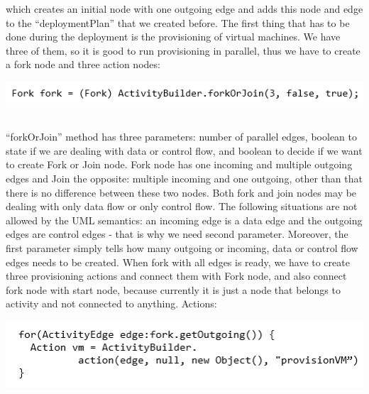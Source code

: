 \noindent which creates an initial node with one outgoing edge and adds this node and edge to the ``deploymentPlan'' that we created before. The first thing that has to be done during the deployment is the provisioning of virtual machines. We have three of them, so it is good to run provisioning in parallel, thus we have to create a fork node and three action nodes:

\begin{center}
	\includegraphics{./Figures/Fork}
	\begin{lstlisting}[mathescape,caption={Fork or Join node},label={lst:5}]
	\end{lstlisting}
\end{center} 

\noindent ``forkOrJoin'' method has three parameters: number of parallel edges, boolean to state if we are dealing with data or control flow, and boolean to decide if we want to create Fork or Join node. Fork node has one incoming and multiple outgoing edges and Join  the opposite: multiple incoming and one outgoing, other than that there is no difference between these two nodes. Both fork and join nodes may be dealing with only data flow or only control flow. The following situations are not allowed by the UML semantics: an incoming edge is a data edge and the outgoing edges are control edges - that is why we need second parameter. Moreover, the first parameter simply tells how many outgoing or incoming, data or control flow edges needs to be created. When fork with all edges is ready, we have to create three provisioning actions and connect them with Fork node, and also connect fork node with start node, because currently it is just a node that belongs to activity and not connected to anything. Actions:

\begin{center}
	\includegraphics{./Figures/Action}
	\begin{lstlisting}[mathescape,caption={Action node},label={lst:6}]
	\end{lstlisting}
\end{center} 

